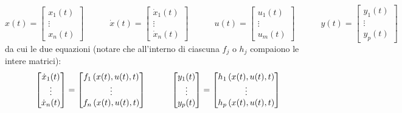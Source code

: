 \documentclass[a4paper]{report}
\begin{document}
\begin{defin}{}{}
	\begin{equation*}
		x(t)= \begin{bmatrix}
			x_1(t) \\
			\vdots \\
			x_n(t)
		\end{bmatrix}
		\quad \quad \quad
		\dot x(t)= \begin{bmatrix}
			\dot x_1(t) \\
			\vdots \\
			\dot x_n(t)
		\end{bmatrix}
		\quad \quad \quad
		u(t)= \begin{bmatrix}
			u_1(t) \\
			\vdots \\
			u_m(t)
		\end{bmatrix}
		\quad \quad \quad
		y(t)= \begin{bmatrix}
			y_1(t) \\
			\vdots \\
			y_p(t)
		\end{bmatrix}
	\end{equation*}
	da cui le due equazioni (notare che all'interno di ciascuna $f_j$ o $h_j$ compaiono le intere matrici):
	\begin{equation}
	\label{f_h_matrices}
			\begin{bmatrix}
			\dot x_1(t) \\
			\vdots \\
			\dot x_n(t)
		\end{bmatrix} = \begin{bmatrix}
	f_1\left( x(t),u(t), t \right) \\
		\vdots \\
			f_n\left( x(t), u(t), t \right)
		\end{bmatrix} \quad \quad \quad 
		\begin{bmatrix}
			y_1(t) \\
			\vdots \\
			y_p(t)
		\end{bmatrix} =
		\begin{bmatrix}
	h_1\left( x(t),u(t), t \right) \\
		\vdots \\
			h_p\left( x(t), u(t), t \right)
		\end{bmatrix}
	\end{equation}
\end{defin}
\end{document}
